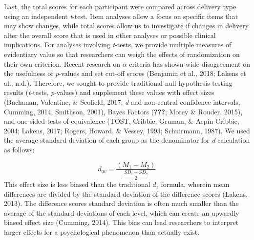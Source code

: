 \documentclass[english,man, mask]{apa6}
\theoremstyle{definition}
\theoremstyle{definition}
\theoremstyle{definition}
\theoremstyle{remark}
\begin{document}
Last, the total scores for each participant were compared across
delivery type using an independent \emph{t}-test. Item analyses allow a
focus on specific items that may show changes, while total scores allow
us to investigate if changes in delivery alter the overall score that is
used in other analyses or possible clinical implications. For analyses
involving \emph{t}-tests, we provide multiple measures of evidentiary
value so that researchers can weigh the effects of randomization on
their own criterion. Recent research on \(\alpha\) criteria has shown
wide disagreement on the usefulness of \emph{p}-values and set cut-off
scores (Benjamin et al., 2018; Lakens et al., n.d.). Therefore, we
sought to provide traditional null hypothesis testing results
(\emph{t}-tests, \emph{p}-values) and supplement these values with
effect sizes (Buchanan, Valentine, \& Scofield, 2017; \emph{d} and
non-central confidence intervals, Cumming, 2014; Smithson, 2001), Bayes
Factors ({\textbf{???}}; Morey \& Rouder, 2015), and one-sided tests of
equivalence (TOST, Cribbie, Gruman, \& Arpin-Cribbie, 2004; Lakens,
2017; Rogers, Howard, \& Vessey, 1993; Schuirmann, 1987). We used the
average standard deviation of each group as the denominator for \emph{d}
calculation as follows:

\[
d_{av} = \frac {(M_1 -  M_2) } { \frac{SD_1 + SD_2 } {2} }
\] This effect size is less biased than the traditional \(d_z\) formula,
wherein mean differences are divided by the standard deviation of the
difference scores (Lakens, 2013). The difference scores standard
deviation is often much smaller than the average of the standard
deviations of each level, which can create an upwardly biased effect
size (Cumming, 2014). This bias can lead researchers to interpret larger
effects for a psychological phenomenon than actually exist.
\end{document}
